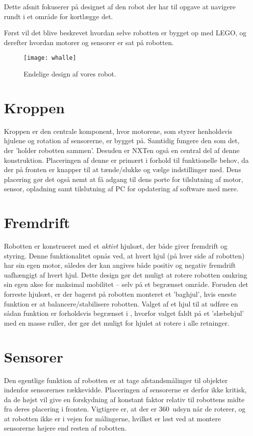 Dette afsnit fokuserer på designet af den robot der har til opgave at navigere rundt i et område for kortlægge det. 

Først vil det blive beskrevet hvordan selve robotten er bygget op med LEGO, og derefter hvordan motorer og sensorer er sat på robotten.

\begin{figure}
\centering
\texttt{[image: whalle]}
\caption{Endelige design af vores robot.}
\label{robot:opbygning}
\end{figure}

\section{Kroppen}
Kroppen er den centrale komponent, hvor motorene, som styrer henholdsvis hjulene og rotation af sensorerne, er bygget på. 
Samtidig fungere den som det, der 'holder robotten sammen'.
Desuden er NXTen også en central del af denne konstruktion.
Placeringen af denne er primært i forhold til funktionelle behov, da der på fronten er knapper til at tænde/slukke og vælge indstillinger med.
Dens placering gør det også nemt at få adgang til dens porte for tilslutning af motor, sensor, opladning samt tilslutning af PC for opdatering af software med mere.

\section{Fremdrift}
Robotten er konstrueret med et \textit{aktivt} hjulsæt, der både giver fremdrift og styring.
Denne funktionalitet opnås ved, at hvert hjul (på hver side af robotten) har sin egen motor, således der kan angives både positiv og negativ fremdrift uafhængigt af hvert hjul.
Dette design gør det muligt at rotere robotten omkring sin egen akse for maksimal mobilitet -- selv på et begrænset område.
Foruden det forreste hjulsæt, er der bagerst på robotten monteret et 'baghjul', hvis eneste funktion er at balancere/stabilisere robotten.
Valget af et hjul til at udføre en sådan funktion er forholdsvis begrænset i \lego, hvorfor valget faldt på et 'slæbehjul' med en masse ruller, der gør det muligt for hjulet at rotere i alle retninger.

\section{Sensorer}
Den egentlige funktion af robotten er at tage afstandsmålinger til objekter indenfor sensorernes rækkevidde.
Placeringen af sensorerne er derfor ikke kritisk, da de højst vil give en forskydning af konstant faktor relativ til robottens midte fra deres placering i fronten.
Vigtigere er, at der er 360\degree~udsyn når de roterer, og at robotten ikke er i vejen for målingerne, hvilket er løst ved at montere sensorerne højere end resten af robotten. 

